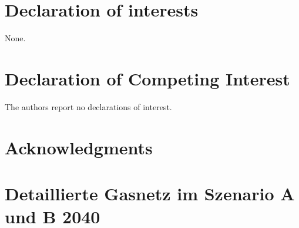 \documentclass[review]{elsarticle}
\begin{document}
\section*{Declaration of interests}
None.
\section*{Declaration of Competing Interest}
The authors report no declarations of interest.
\section*{Acknowledgments}



\appendix
\setcounter{table}{0}
\setcounter{figure}{0}

\section{Detaillierte Gasnetz im Szenario A und B 2040}\label{app_results_2040_extension}
%
\end{document}
